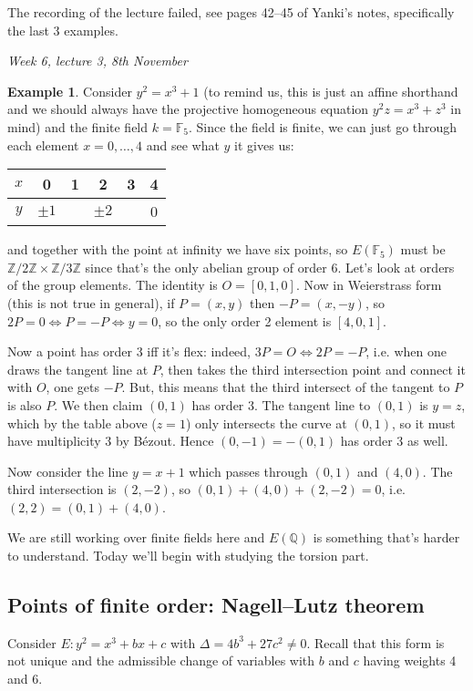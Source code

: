 \documentclass{article}
\newcommand{\F}{\mathbb{F}}
\newcommand{\Z}{\mathbb{Z}}
\newcommand{\Q}{\mathbb{Q}}
\theoremstyle{definition}
\newtheorem{example}[defn]{Example}
\begin{document}
The recording of the lecture failed, see pages 42--45 of Yanki's notes, specifically the last 3 examples.

\begin{flushright}
\textit{Week 6, lecture 3, 8th November}
\end{flushright}

\begin{example}
Consider $y^2=x^3+1$ (to remind us, this is just an affine shorthand and we should always have the projective homogeneous equation $y^2z=x^3+z^3$ in mind) and the finite field $k=\F_5$. Since the field is finite, we can just go through each element $x=0,\ldots,4$ and see what $y$ it gives us:

\begin{table}[h]
\centering
\begin{tabular}{c|ccccc}
$x$ & 0       & 1 & 2       & 3 & 4 \\ \hline
$y$ & $\pm 1$ &   & $\pm 2$ &   & 0
\end{tabular}
\end{table}

and together with the point at infinity we have six points, so $E(\F_5)$ must be $\Z/2\Z\times\Z/3\Z$ since that's the only abelian group of order 6. Let's look at orders of the group elements. The identity is $O=[0,1,0]$. Now in Weierstrass form (this is not true in general), if $P=(x,y)$ then $-P=(x,-y)$, so $2P=0\iff P=-P\iff y=0$, so the only order 2 element is $[4,0,1]$.

Now a point has order 3 iff it's flex: indeed, $3P=O\iff 2P=-P$, i.e. when one draws the tangent line at $P$, then takes the third intersection point and
connect it with $O$, one gets $-P$. But, this means that the third intersect of the tangent to $P$ is
also $P$. We then claim $(0,1)$ has order 3. The tangent line to $(0,1)$ is $y=z$, which by the table above ($z=1$) only intersects the curve at $(0,1)$, so it must have multiplicity 3 by Bézout. Hence $(0,-1)=-(0,1)$ has order 3 as well.

Now consider the line $y=x+1$ which passes through $(0,1)$ and $(4,0)$. The third intersection is $(2,-2)$, so $(0,1)+(4,0)+(2,-2)=0$, i.e. $(2,2)=(0,1)+(4,0)$.

We are still working over finite fields here and $E(\Q)$ is something that's harder to understand. Today we'll begin with studying the torsion part.
\end{example}

\subsection{Points of finite order: Nagell--Lutz theorem}
Consider $E:y^2=x^3+bx+c$ with $\Delta=4b^3+27c^2\neq 0$. Recall that this form is not unique and the admissible change of variables with $b$ and $c$ having weights 4 and 6.
\end{document}
